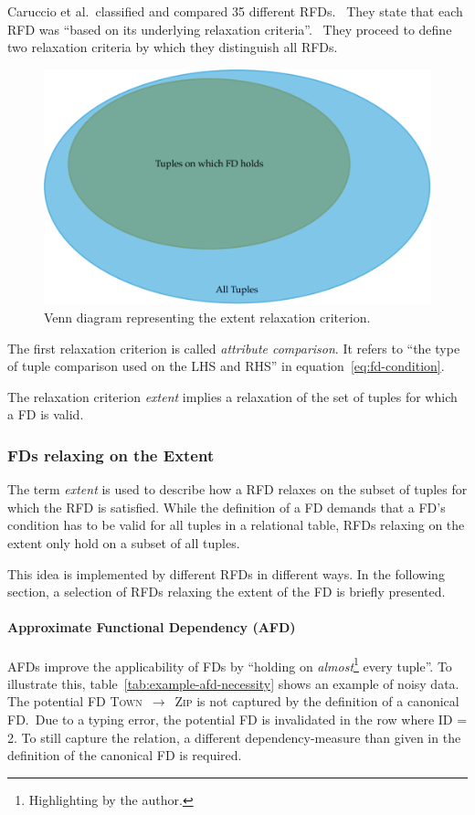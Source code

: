 Caruccio et al.\ classified and compared 35 different RFDs.~\cite[p.~151]{CAR16}
They state that each RFD was ``based on its underlying relaxation criteria''.~\cite[p.~149]{CAR16}
They proceed to define two relaxation criteria by which they distinguish all RFDs.

\begin{figure}[ht]
     \centering
     \includegraphics[width=\textwidth]{images/rfds-extent.pdf}
     \caption{Venn diagram representing the extent relaxation criterion.}
     \label{fig:rfds-extent}
 \end{figure}

The first relaxation criterion is called \emph{attribute comparison}.
It refers to ``the type of tuple comparison used on the LHS and RHS'' in equation~\ref{eq:fd-condition}.

The relaxation criterion \emph{extent} implies a relaxation of the set of tuples for which a FD is valid.

\subsubsection{FDs relaxing on the Extent}
The term \emph{extent} is used to describe how a RFD relaxes on the subset of tuples for which the RFD is satisfied.
While the definition of a FD demands that a FD's condition has to be valid for all tuples in a relational table, RFDs relaxing on the extent only hold on a subset of all tuples.

This idea is implemented by different RFDs in different ways.
In the following section, a selection of RFDs relaxing the extent of the FD is briefly presented.

\paragraph{Approximate Functional Dependency (AFD)}
AFDs improve the applicability of FDs by ``holding on \emph{almost}\footnote{Highlighting by the author.} every tuple''\cite[p.~151]{CAR16}.
To illustrate this, table~\ref{tab:example-afd-necessity} shows an example of noisy data.
The potential FD \textsc{Town}~\(\to\)~\textsc{Zip} is not captured by the definition of a canonical FD.\
Due to a typing error, the potential FD is invalidated in the row where \textsc{ID = 2}.
To still capture the relation, a different dependency-measure than given in the definition of the canonical FD is required.

